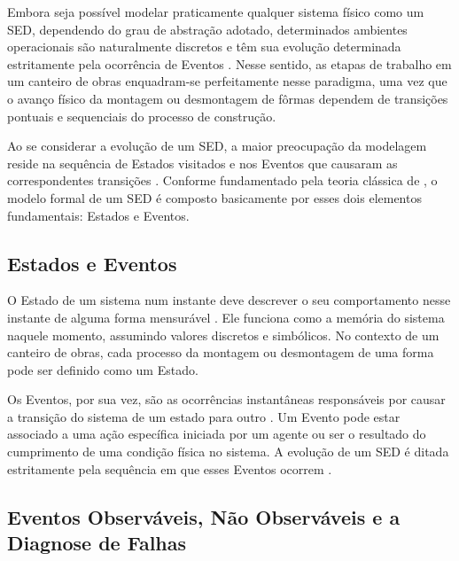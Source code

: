Embora seja possível modelar praticamente qualquer sistema físico como um SED, dependendo do grau de abstração adotado, determinados ambientes operacionais são naturalmente discretos e têm sua evolução determinada estritamente pela ocorrência de Eventos \cite{mestradoDudu}. Nesse sentido, as etapas de trabalho em um canteiro de obras enquadram-se perfeitamente nesse paradigma, uma vez que o avanço físico da montagem ou desmontagem de fôrmas dependem de transições pontuais e sequenciais do processo de construção.

Ao se considerar a evolução de um SED, a maior preocupação da modelagem reside na sequência de Estados visitados e nos Eventos que causaram as correspondentes transições \cite{mestradoDudu}. Conforme fundamentado pela teoria clássica de \cite{cassandra2008}, o modelo formal de um SED é composto basicamente por esses dois elementos fundamentais: Estados e Eventos.

\subsection{Estados e Eventos}
\label{subsec:estados_eventos}

O Estado de um sistema num instante deve descrever o seu comportamento
nesse instante de alguma forma mensurável \cite{cassandra2008}. Ele funciona como a memória do sistema naquele momento, assumindo valores discretos e simbólicos. No contexto de um canteiro de obras, cada processo da montagem ou desmontagem de uma forma pode ser definido como um Estado.

Os Eventos, por sua vez, são as ocorrências instantâneas responsáveis por causar a transição do sistema de um estado para outro \cite{cassandra2008}. Um Evento pode estar associado a uma ação específica iniciada por um agente ou ser o resultado do cumprimento de uma condição física no sistema. A evolução de um SED é ditada estritamente pela sequência em que esses Eventos ocorrem \cite{basilio2010}.

\subsection{Eventos Observáveis, Não Observáveis e a Diagnose de Falhas}
\label{subsec:observabilidade_falhas}

